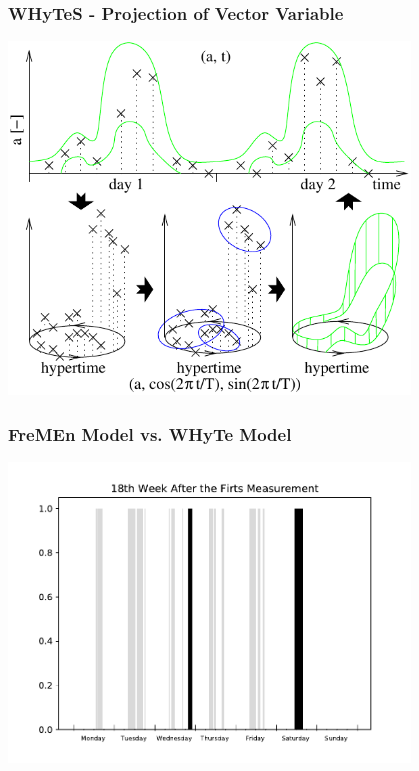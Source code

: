\begin{frame}
	\frametitle{WHyTeS - Projection of Vector Variable}
    \vspace{3mm}
            \includegraphics[width=0.8\textwidth]{fig/hypertime_space.pdf}
\end{frame}



\begin{frame}
	\frametitle{FreMEn Model vs. WHyTe Model}
    \vspace{3mm}
            \includegraphics[width=0.8\textwidth]{fig/outliers_test.pdf}
\end{frame}




